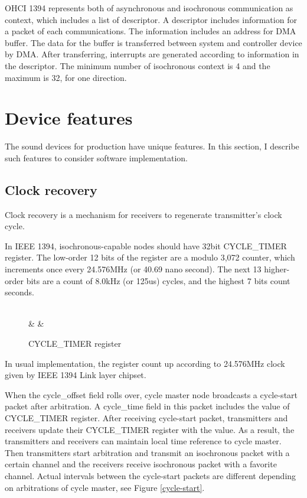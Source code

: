 \documentclass[onecolumn]{article}
\begin{document}
OHCI 1394 represents both of asynchronous and isochronous communication as context, which includes a list of descriptor. A descriptor includes information for a packet of each communications. The information includes an address for DMA buffer. The data for the buffer is transferred between system and controller device by DMA. After transferring, interrupts are generated according to information in the descriptor. The minimum number of isochronous context is 4 and the maximum is 32, for one direction.

\section{Device features}

The sound devices for production have unique features. In this section, I describe such features to consider software implementation.

\subsection{Clock recovery}
\label{sec:clock-recovery}

Clock recovery is a mechanism for receivers to regenerate transmitter's clock cycle.

In IEEE 1394\cite{ieee1394-2}, isochronous-capable nodes should have 32bit CYCLE\_TIMER register. The low-order 12 bits of the register are a modulo 3,072 counter, which increments once every 24.576MHz (or 40.69 nano second). The next 13 higher-order bits are a count of 8.0kHz (or 125us) cycles, and the highest 7 bits count seconds.

\begin{figure}[htbp]
\centering
\begin{bytefield}[bitwidth=auto,endianness=big]{32}
	 \\
	 &
	 &
\end{bytefield}
\caption{{CYCLE\_TIMER register}}
\label{cycle_timer}
\end{figure}

In usual implementation, the register count up according to 24.576MHz clock given by IEEE 1394 Link layer chipset.

When the cycle\_offset field rolls over, cycle master node broadcasts a cycle-start packet after arbitration. A cycle\_time field in this packet includes the value of CYCLE\_TIMER register. After receiving cycle-start packet, transmitters and receivers update their CYCLE\_TIMER register with the value. As a result, the transmitters and receivers can maintain local time reference to cycle master. Then transmitters start arbitration and transmit an isochronous packet with a certain channel and the receivers receive isochronous packet with a favorite channel. Actual intervals between the cycle-start packets are different depending on arbitrations of cycle master, see Figure \ref{cycle-start}.
\end{document}

